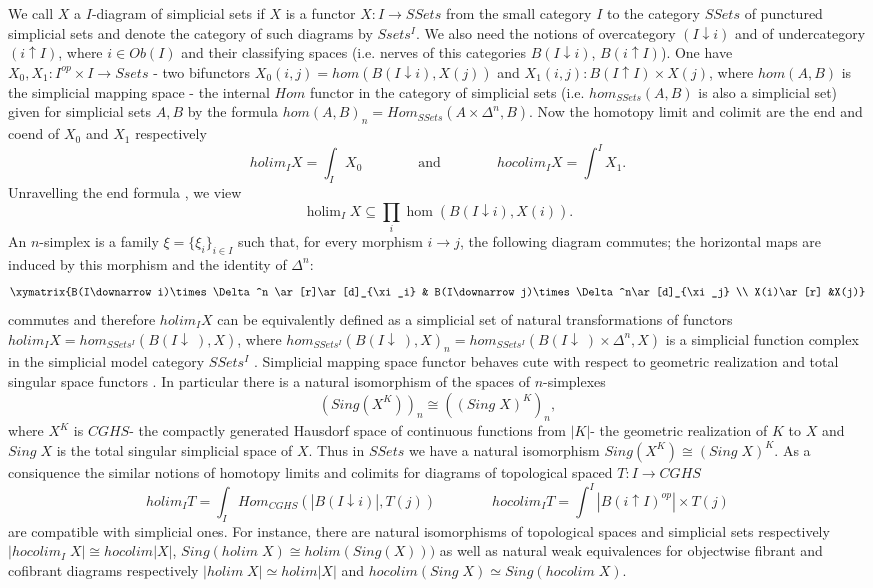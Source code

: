 \documentclass[11pt,a4paper]{article}
\begin{document}
We call $X$ a $I$-diagram of simplicial sets if $X$ is a functor $X: I\rightarrow SSets$ from the small category $I$ to the category $SSets$ of punctured simplicial sets
and denote the category of such diagrams by $Ssets^I$. We also need the notions of overcategory $(I\downarrow i)$ and of undercategory $(i\uparrow I)$, where $i\in Ob(I)$ \cite[2.1]{Hir2} and their classifying spaces (i.e. nerves of this categories $B(I\downarrow i)$, $B(i\uparrow I)$).
One have $X_0, X_1 : I^{op}\times I\rightarrow Ssets$ - two bifunctors $X_0(i,j)=hom(B(I\downarrow i), X(j))$ and $X_1(i,j):B(I\uparrow I)\times X(j)$, where $hom(A,B)$ is the simplicial mapping space - the internal $Hom$ functor in the category of simplicial sets (i.e. $hom_{SSets}(A,B)$ is also a simplicial set) given for simplicial sets $A,B$ by the formula $hom(A,B)_n=Hom_{SSets}(A\times \Delta^n,B)$.
Now the homotopy limit and colimit are the end and coend of $X_0$ and $X_1$ respectively
$$holim_I X=\int_I X_0\qquad\qquad \text{and}\qquad\qquad hocolim_I X=\int^I X_1.$$
Unravelling the end formula \cite[7.4.6, 7.4.11]{MV}, we view
\[
 \operatorname{holim}_I X\subseteq
 \prod_i\operatorname{hom}(B(I\downarrow i),X(i)).
\]
An $n$-simplex is a family $\xi=\{\xi_i\}_{i\in I}$ such that, for
every morphism $i\to j$, the following diagram commutes; the horizontal
maps are induced by this morphism and the identity of $\Delta^n$:
$$\xymatrix{B(I\downarrow i)\times \Delta^n  \ar[r]\ar[d]_{\xi_i} & B(I\downarrow j)\times \Delta^n\ar[d]_{\xi_j} \\
X(i)\ar[r] &X(j)}$$
commutes and therefore $holim_I X$ can be equivalently defined as a simplicial set of natural transformations of functors 
$holim_I X = hom_{SSets^I} (B(I\downarrow \:),X)$, where 
$hom_{SSets^I} (B(I\downarrow\:),X)_n=hom_{SSets^I}(B(I\downarrow\:)\times \Delta^n,X)$ is a simplicial function complex in the simplicial model category $SSets^I$ \cite[I.5]{GJ}.
Simplicial mapping space functor behaves cute with respect to geometric realization and total singular space functors \cite[I.1]{GJ}. In particular there is a natural isomorphism of the spaces of $n$-simplexes $$(Sing(X^K))_n\cong ((Sing\; X)^K)_n,$$
where $X^K$ is $CGHS$- the compactly generated Hausdorf space  of continuous functions from $|K|$- the geometric realization of $K$ to $X$ and $Sing\; X$ is the total singular simplicial space of $X$. Thus  in $SSets$ we have a natural isomorphism $Sing(X^K)\cong (Sing\;X)^K$.
As a consiquence the similar notions of homotopy limits and colimits for diagrams of topological spaced $T: I\rightarrow CGHS$ 
$$holim_I T=\int_I Hom_{CGHS}(|B(I\downarrow i)|, T(j)) \qquad\qquad hocolim_I T=\int^I |B(i\uparrow I)^{op}|\times T(j)$$ 
are compatible with simplicial ones. For instance, there are natural isomorphisms of topological spaces and simplicial sets respectively \cite[14.2]{Hir2} $|hocolim_I\;X|\cong hocolim|X|$, $Sing(holim\; X)\cong holim(Sing(X)))$ as well as natural weak equivalences for objectwise fibrant and cofibrant diagrams respectively $|holim\; X|\simeq holim|X|$ and $hocolim(Sing\; X)\simeq Sing(hocolim\; X)$.
\end{document}
